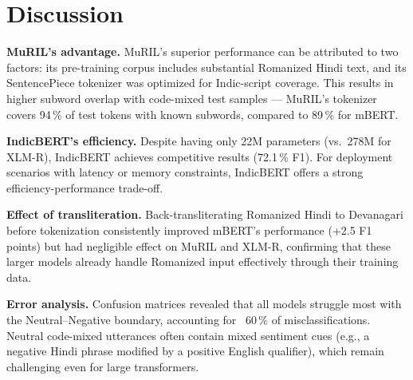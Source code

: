 \section{Discussion}

\textbf{MuRIL's advantage.} MuRIL's superior performance can be attributed to two factors: its pre-training corpus includes substantial Romanized Hindi text, and its SentencePiece tokenizer was optimized for Indic-script coverage. This results in higher subword overlap with code-mixed test samples — MuRIL's tokenizer covers 94\,\% of test tokens with known subwords, compared to 89\,\% for mBERT.

\textbf{IndicBERT's efficiency.} Despite having only 22M parameters (vs.\ 278M for XLM-R), IndicBERT achieves competitive results (72.1\,\% F1). For deployment scenarios with latency or memory constraints, IndicBERT offers a strong efficiency-performance trade-off.

\textbf{Effect of transliteration.} Back-transliterating Romanized Hindi to Devanagari before tokenization consistently improved mBERT's performance (+2.5 F1 points) but had negligible effect on MuRIL and XLM-R, confirming that these larger models already handle Romanized input effectively through their training data.

\textbf{Error analysis.} Confusion matrices revealed that all models struggle most with the Neutral--Negative boundary, accounting for ~60\,\% of misclassifications. Neutral code-mixed utterances often contain mixed sentiment cues (e.g., a negative Hindi phrase modified by a positive English qualifier), which remain challenging even for large transformers.

